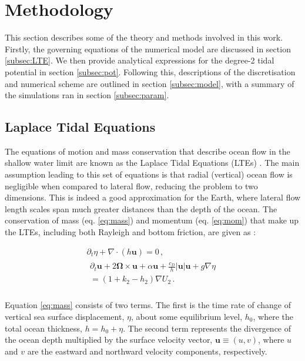 \section{Methodology}

This section describes some of the theory and methods involved in this work. Firstly, the governing equations of the numerical model are discussed in section \ref{subsec:LTE}. We then provide analytical expressions for the degree-2 tidal potential in section \ref{subsec:pot}. Following this, descriptions of the discretisation and numerical scheme are outlined in section \ref{subsec:model}, with a summary of the simulations ran in section \ref{subsec:param}.

\subsection{Laplace Tidal Equations \label{subsec:LTE}}

The equations of motion and mass conservation that describe ocean flow in the shallow water limit are known as the Laplace Tidal Equations (LTEs) \citep{lamb1932hydrodynamics}. The main assumption leading to this set of equations is that radial (vertical) ocean flow is negligible when compared to lateral flow, reducing the problem to two dimensions. This is indeed a good approximation for the Earth, where lateral flow length scales span much greater distances than the depth of the ocean. The conservation of mass (eq. \ref{eq:mass}) and momentum (eq. \ref{eq:mom}) that make up the LTEs, including both Rayleigh and bottom friction, are given as \citep{sears1995tidal,tyler2008strong,matsuyama2014tidal}:


\vspace{-0.5cm}
\begin{gather}
\partial_t \eta + \nabla \cdot \left(h \bm{u}\right) = 0\, , \label{eq:mass}\\
\begin{aligned} 
\partial_t \bm{u} + 2 \bm{\Omega} \times \bm{u} + \alpha\bm{u} + \frac{c_D}{h} \left|\bm{u}\right| \bm{u}  + g \nabla \eta \\ = (1 + k_2 - h_2) \nabla U_2 \, . \label{eq:mom}\\
\end{aligned} 
\end{gather}

Equation \ref{eq:mass} consists of two terms. The first is the time rate of change of vertical sea surface displacement, $\eta$, about some equilibrium level, $h_0$, where the total ocean thickness, $h = h_0 + \eta$. The second term represents the divergence of the ocean depth multiplied by the surface velocity vector, $\bm{u} \equiv (u, v)$, where $u$ and $v$ are the eastward and northward velocity components, respectively.


